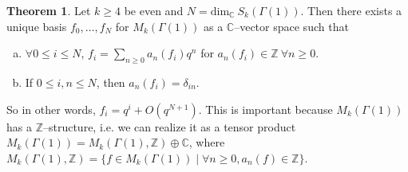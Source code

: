 \documentclass{article}
\theoremstyle{definition}
\newtheorem{theorem}{Theorem}[section]
\begin{document}

\begin{theorem}
    Let $k\ge 4$ be even and $N = \text{dim}_{\mathbb{C}}~S_k(\Gamma(1))$. Then there exists a unique basis $f_0,\ldots,f_N$ for $M_k(\Gamma(1))$ as a $\mathbb{C}$--vector space such that
    \begin{enumerate}[(a)]
        \item $\forall 0\le i\le N$, $f_i = \sum_{n\ge 0}^{} a_n(f_i)q^n$ for $a_n(f_i) \in \mathbb{Z} ~\forall n\ge 0$.
        \item If $0\le i,n\le N$, then $a_n(f_i)=\delta_{in}$.
    \end{enumerate}
\end{theorem}
So in other words, $f_i = q^i + O(q^{N+1})$. This is important because $M_k(\Gamma(1))$ has a $\mathbb{Z}$--structure, i.e. we can realize it as a tensor product $M_k(\Gamma(1)) = M_k(\Gamma(1),\mathbb{Z})\oplus \mathbb{C}$, where $M_k(\Gamma(1),\mathbb{Z}) = \{f \in M_k(\Gamma(1)) \mid \forall n\ge 0, a_n(f) \in \mathbb{Z}\}$.
\end{document}
